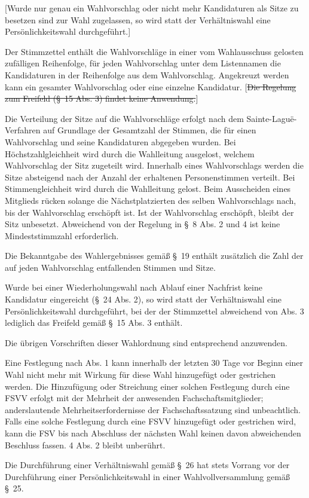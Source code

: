 \documentclass[%
draft,%
multilinesections%
]{fswo}
\newcommand\oldT[1]  {{\color{Gray}[\st{#1}]}}
\newcommand\newT[1]  {{\color{Green}[#1]}}
\newcommand\oldT[1]{}%
\newcommand\newT[1]{#1}
\begin{document}
\begin{contract}
\newT{Wurde nur genau ein Wahlvorschlag oder nicht mehr Kandidaturen als Sitze zu besetzen sind zur Wahl zugelassen, so wird statt der Verhältniswahl eine Persönlichkeitswahl durchgeführt.}

Der Stimmzettel enthält die Wahlvorschläge in einer vom Wahlausschuss gelosten zufälligen Reihenfolge, für jeden Wahlvorschlag unter dem Listennamen die Kandidaturen in der Reihenfolge aus dem Wahlvorschlag.
Angekreuzt werden kann ein gesamter Wahlvorschlag oder eine einzelne Kandidatur.
\oldT{Die Regelung zum Freifeld (\S~15 Abs. 3) findet keine Anwendung.}

Die Verteilung der Sitze auf die Wahlvorschläge erfolgt nach dem Sainte-Laguë-Verfahren auf Grundlage der Gesamtzahl der Stimmen, die für einen Wahlvorschlag und seine Kandidaturen abgegeben wurden.
Bei Höchstzahlgleichheit wird durch die Wahlleitung ausgelost, welchem Wahlvorschlag der Sitz zugeteilt wird.
Innerhalb eines Wahlvorschlags werden die Sitze absteigend nach der Anzahl der erhaltenen Personenstimmen verteilt.
Bei Stimmengleichheit wird durch die Wahlleitung gelost.
Beim Ausscheiden eines Mitglieds rücken solange die Nächstplatzierten des selben Wahlvorschlags nach, bis der Wahlvorschlag erschöpft ist.
Ist der Wahlvorschlag erschöpft, bleibt der Sitz unbesetzt.
Abweichend von der Regelung in \S~8 Abs. 2 und 4 ist keine Mindeststimmzahl erforderlich.

Die Bekanntgabe des Wahlergebnisses gemäß \S~19 enthält zusätzlich die Zahl der auf jeden Wahlvorschlag entfallenden Stimmen und Sitze.

Wurde bei einer Wiederholungswahl nach Ablauf einer Nachfrist keine Kandidatur eingereicht (\S~24 Abs. 2), so wird statt der Verhältniswahl eine Persönlichkeitswahl durchgeführt, bei der der Stimmzettel abweichend von Abs. 3 lediglich das Freifeld gemäß \S~15 Abs. 3 enthält.

Die übrigen Vorschriften dieser Wahlordnung sind entsprechend anzuwenden.

Eine Festlegung nach Abs. 1 kann innerhalb der letzten 30 Tage vor Beginn einer Wahl nicht mehr mit Wirkung für diese Wahl hinzugefügt oder gestrichen werden.
Die Hinzufügung oder Streichung einer solchen Festlegung durch eine FSVV erfolgt mit der Mehrheit der anwesenden Fachschaftsmitglieder; anderslautende Mehrheitserfordernisse der Fachschaftssatzung sind unbeachtlich.
Falls eine solche Festlegung durch eine FSVV hinzugefügt oder gestrichen wird, kann die FSV bis nach Abschluss der nächsten Wahl keinen davon abweichenden Beschluss fassen. 4 Abs. 2 bleibt unberührt.

Die Durchführung einer Verhältniswahl gemäß \S~26 hat stets Vorrang vor der Durchführung einer Persönlichkeitswahl in einer Wahlvollversammlung gemäß \S~25.
\end{contract}
\end{document}

